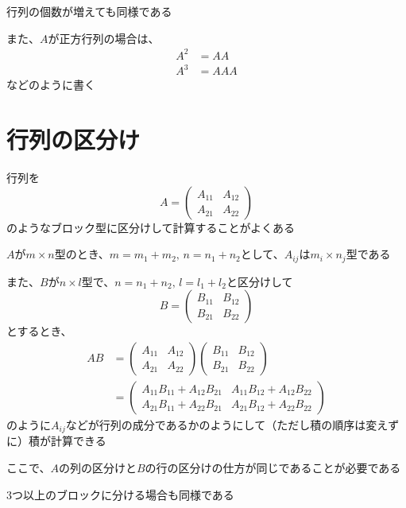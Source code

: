 \documentclass[../../../topic_linear-map]{subfiles}
\begin{document}
行列の個数が増えても同様である

\br

また、$A$が正方行列の場合は、
\begin{align*}
  A^2 & = AA  \\
  A^3 & = AAA
\end{align*}
などのように書く

\sectionline
\section{行列の区分け}

行列を
\begin{equation*}
  A = \begin{pmatrix}
    A_{11} & A_{12} \\
    A_{21} & A_{22}
  \end{pmatrix}
\end{equation*}
のようなブロック型に区分けして計算することがよくある

\br

$A$が$m \times n$型のとき、$m = m_1 + m_2, \, n = n_1 + n_2$として、$A_{ij}$は$m_i \times n_j$型である

\br

また、$B$が$n \times l$型で、$n = n_1 + n_2, \, l = l_1 + l_2$と区分けして
\begin{equation*}
  B = \begin{pmatrix}
    B_{11} & B_{12} \\
    B_{21} & B_{22}
  \end{pmatrix}
\end{equation*}
とするとき、
\begin{align*}
  AB & = \begin{pmatrix}
           A_{11} & A_{12} \\
           A_{21} & A_{22}
         \end{pmatrix} \begin{pmatrix}
                         B_{11} & B_{12} \\
                         B_{21} & B_{22}
                       \end{pmatrix}                             \\
     & = \begin{pmatrix}
           A_{11}B_{11} + A_{12}B_{21} & A_{11}B_{12} + A_{12}B_{22} \\
           A_{21}B_{11} + A_{22}B_{21} & A_{21}B_{12} + A_{22}B_{22}
         \end{pmatrix}
\end{align*}
のように$A_{ij}$などが行列の成分であるかのようにして（ただし積の順序は変えずに）積が計算できる

ここで、$A$の列の区分けと$B$の行の区分けの仕方が同じであることが必要である

\br

3つ以上のブロックに分ける場合も同様である
\end{document}
